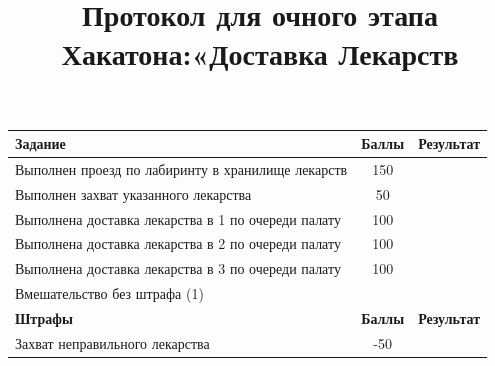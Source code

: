 \documentclass[12pt]{article}
\date{} %
\title{Протокол для очного этапа \\ Хакатона:«Доставка Лекарств}
\newcommand{\penaltyOne}{\color{red}-50}
\newcommand{\namePenaltyOne}{Захват неправильного лекарства}
\newcommand{\taskOne}{150}
\newcommand{\nameTaskOne}{Выполнен проезд по лабиринту в хранилище лекарств}
\newcommand{\taskSecond}{50}
\newcommand{\nameTaskSecond}{Выполнен захват указанного лекарства}
\newcommand{\taskThird}{100}
\newcommand{\nameTaskThird}{Выполнена доставка лекарства в 1 по очереди палату}
\newcommand{\taskFourth}{100}
\newcommand{\nameTaskFourth}{Выполнена доставка лекарства в 2 по очереди палату}
\newcommand{\taskFifth}{100}
\newcommand{\nameTaskFifth}{Выполнена доставка лекарства в 3 по очереди палату}
\begin{document}
\maketitle
\thispagestyle{empty}
\vspace*{-2cm}


\renewcommand{\arraystretch}{1}
\vspace*{0.25cm}
\begin{tabularx}{\textwidth}{|X|c|p{2cm}|}
    \hline
    \textbf{Задание} & \textbf{Баллы} & \textbf{Результат}\\
    \hline
    \nameTaskOne & \taskOne &  \\
    \hline
    \nameTaskSecond & \taskSecond & \\
    \hline
    \nameTaskThird & \taskThird & \\
    \hline 
    \nameTaskFourth & \taskFourth & \\
    \hline
    \nameTaskFifth & \taskFifth & \\
    \hline
    Вмешательство без штрафа (1) & & \\
    \hline
    \textbf{Штрафы} & \textbf{Баллы} & \textbf{Результат} \\
    \hline
    \namePenaltyOne & \penaltyOne &  \\
    \hline
\end{tabularx}
\vspace*{0.25cm}
\end{document}
